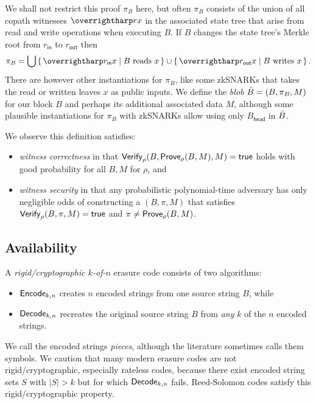 \newcommand\rin{\ensuremath{r_{\mathsf{in}}}} %
\newcommand\rout{\ensuremath{r_{\mathsf{out}}}} %
We shall not restrict this proof $\pi_B$ here, but often $\pi_B$ consists of the union of all copath witnesses $\vect{rx}$ in the associated state tree that arise from read and write operations when executing $B$.  If $B$ changes the state tree's Merkle root from $\rin$ to $\rout$ then 
$$
\pi_B = 
  \bigcup \Setst{ \vect{\rin x} }{ \textrm{$B$ reads $x$} }
  \cup \Setst{ \vect{\rout x} }{ \textrm{$B$ writes $x$} } \mathperiod
$$
There are however other instantiations for $\pi_B$, like some zkSNARKs that takes the read or written leaves $x$ as public inputs.  We define the {\em blob} $\bar{B} = (B, \pi_B, M)$ for our block $B$ and perhaps its additional associated data $M$, although some plausible instantiations for $\pi_B$ with zkSNARKs allow using only $B_{\mathsf{head}}$ in $\bar{B}$.

We observe this definition satisfies:
\begin{itemize}
\item {\em witness correctness} in that $\mathsf{Verify}_{\rho}(B,\mathsf{Prove}_{\rho}(B,M),M) = \mathsf{true}$ holds with good probability for all $B,M$ for $\rho$, and
\item {\em witness security} in that 
any probabilistic polynomial-time adversary has only negligible odds of constructing a $(B,\pi,M)$ that satisfies $\mathsf{Verify}_{\rho}(B,\pi,M) = \mathsf{true}$ and $\pi \ne \mathsf{Prove}_{\rho}(B,M)$.
\end{itemize}

\subsection{Availability}

A {\em rigid/cryptographic $k$-of-$n$} erasure code consists of two algorithms:
\begin{itemize}
\item $\mathsf{Encode}_{k,n}$ creates $n$ encoded strings from one source string $B$, while
\item $\mathsf{Decode}_{k,n}$ recreates the original source string $B$ from {\em any} $k$ of the $n$ encoded strings.
\end{itemize}
We call the encoded strings {\em pieces}, although the literature sometimes calls them symbols.  We caution that many modern erasure codes are not rigid/cryptographic, especially rateless codes, because there exist encoded string sets $S$ with $|S| > k$ but for which $\mathsf{Decode}_{k,n}$ fails.  Reed-Solomon codes satisfy this rigid/cryptographic property.

